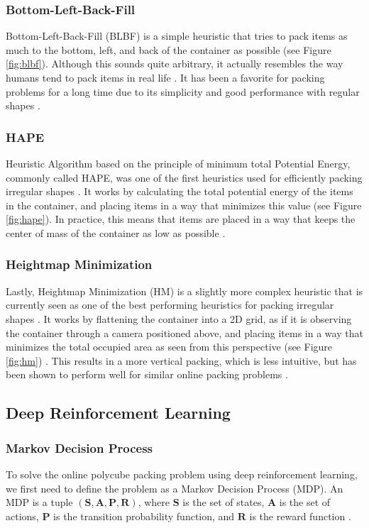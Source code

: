 \documentclass[conference]{IEEEtran}
\begin{document}
\subsubsection{Bottom-Left-Back-Fill}
Bottom-Left-Back-Fill (BLBF) is a simple heuristic that tries to pack items as much to the bottom, left, and back of the container as possible (see Figure \ref{fig:blbf}).
Although this sounds quite arbitrary, it actually resembles the way humans tend to pack items in real life \cite{Zhao2022general} \cite{Karabulut2005}.
It has been a favorite for packing problems for a long time due to its simplicity and good performance with regular shapes \cite{Zhao2022pct}.

\subsubsection{HAPE}
Heuristic Algorithm based on the principle of minimum total Potential Energy, commonly called HAPE, was one of the first heuristics used for efficiently packing irregular shapes \cite{Zhao2022general} \cite{Xiao2011}.
It works by calculating the total potential energy of the items in the container, and placing items in a way that minimizes this value (see Figure \ref{fig:hape}).
In practice, this means that items are placed in a way that keeps the center of mass of the container as low as possible \cite{Zhao2022general} \cite{Xiao2011}.

\subsubsection{Heightmap Minimization}
Lastly, Heightmap Minimization (HM) is a slightly more complex heuristic that is currently seen as one of the best performing heuristics for packing irregular shapes \cite{Zhao2022general}.
It works by flattening the container into a 2D grid, as if it is observing the container through a camera positioned above, and placing items in a way that minimizes the total occupied area as seen from this perspective (see Figure \ref{fig:hm}) \cite{Wang2018}.
This results in a more vertical packing, which is less intuitive, but has been shown to perform well for similar online packing problems \cite{Zhao2022general}.

\subsection{Deep Reinforcement Learning}

\subsubsection{Markov Decision Process}
To solve the online polycube packing problem using deep reinforcement learning, we first need to define the problem as a Markov Decision Process (MDP).
An MDP is a tuple $(\mathbf{S}, \mathbf{A}, \mathbf{P}, \mathbf{R})$, where $\mathbf{S}$ is the set of states, $\mathbf{A}$ is the set of actions, $\mathbf{P}$ is the transition probability function, and $\mathbf{R}$ is the reward function \cite{Sutton1998}.
\end{document}
